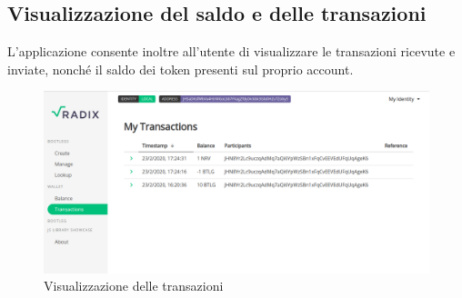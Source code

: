 \subsection{Visualizzazione del saldo e delle transazioni}

L'applicazione consente inoltre all'utente di visualizzare le transazioni ricevute e inviate, nonché il saldo dei token presenti sul proprio account.

\begin{figure}[H]
    \includegraphics[width=\linewidth]{images/application/transactions.png}
    \caption{Visualizzazione delle transazioni}
    \label{fig:transactions}
\end{figure}
